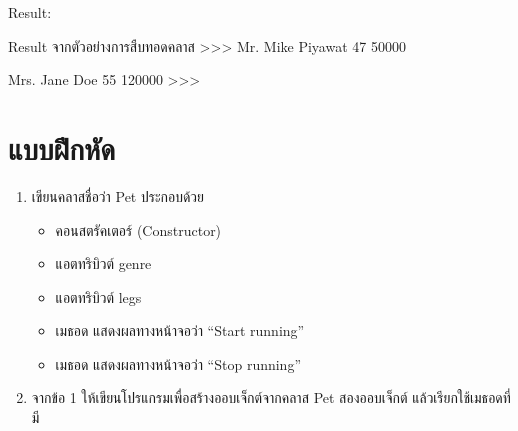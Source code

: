 Result:
\begin{codelist}{Result จากตัวอย่างการสืบทอดคลาส}{}
>>>
Mr. Mike Piyawat
47
50000


Mrs. Jane Doe
55
120000
>>> 
\end{codelist}


\section{แบบฝึกหัด}
\begin{enumerate} 
\item 	เขียนคลาสชื่อว่า Pet ประกอบด้วย
	\begin{itemize}
	\item 	คอนสตรัคเตอร์ (Constructor)
	\item 	แอตทริบิวต์ genre
	\item 	แอตทริบิวต์ legs
	\item 	เมธอด  แสดงผลทางหน้าจอว่า “Start running”
	\item 	เมธอด  แสดงผลทางหน้าจอว่า “Stop running”
	\end{itemize}
\item 	 จากข้อ 1 ให้เขียนโปรแกรมเพื่อสร้างออบเจ็กต์จากคลาส Pet สองออบเจ็กต์ แล้วเรียกใช้เมธอดที่มี
\end{enumerate}